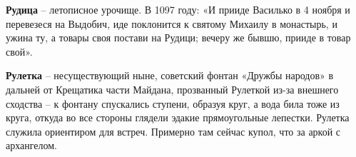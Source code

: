 \textbf{Рудица} – летописное урочище. В 1097 году: «И прииде Василько в 4 ноября и перевезеся на Выдобич, иде поклонится к святому Михаилу в монастырь, и ужина ту, а товары своя постави на Рудици; вечеру же бывшю, прииде в товар свой».\\

\medskip


\textbf{Рулетка} – несуществующий ныне, советский фонтан «Дружбы народов» в дальней от Крещатика части Майдана, прозванный Рулеткой из-за внешнего сходства – к фонтану спускались ступени, образуя круг, а вода била тоже из круга, откуда во все стороны глядели эдакие прямоугольные лепестки. Рулетка служила ориентиром для встреч. Примерно там сейчас купол, что за аркой с архангелом.
